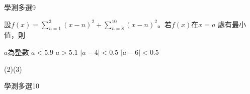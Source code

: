 \begin{QUESTIONS}
\begin{QUESTION}
\begin{QANS}
        \end{QANS}
        \begin{QSOLLIST}
        \end{QSOLLIST}
        \begin{QEMPTYSPACE}
        \end{QEMPTYSPACE}
    \end{QUESTION}
\end{QUESTIONS}\begin{QUESTIONS}
    \begin{QUESTION}
        \begin{ExamInfo}{86}{學測}{多選}{9}
        \end{ExamInfo}
        \begin{ExamAnsRateInfo}{}{}{}{}
        \end{ExamAnsRateInfo}
        \begin{QBODY}
            設$f\left( x \right)=\sum\nolimits_{n=1}^{3}{{{\left( x-n \right)}^{2}}+\sum\nolimits_{n=8}^{10}{{{\left( x-n \right)}^{2}}}}$。若$f\left( x \right)$在$x=a$ 處有最小值，則
            \begin{QOPS}
                \QOP $a$為整數
                \QOP $a<5.9$
                \QOP $a>5.1$
                \QOP $\left| a-4 \right|<0.5$
                \QOP $\left| a-6 \right|<0.5$                
            \end{QOPS}
        \end{QBODY}
        \begin{QFROMS}
        \end{QFROMS}
        \begin{QTAGS}\end{QTAGS}
        \begin{QANS}
            (2)(3)
        \end{QANS}
        \begin{QSOLLIST}
        \end{QSOLLIST}
        \begin{QEMPTYSPACE}
        \end{QEMPTYSPACE}
    \end{QUESTION}
    \begin{QUESTION}
        \begin{ExamInfo}{86}{學測}{多選}{10}
        \end{ExamInfo}
        \begin{ExamAnsRateInfo}{}{}{}{}
        \end{ExamAnsRateInfo}
        \begin{QBODY}

\end{QBODY}
\end{QUESTION}
\end{QUESTIONS}
